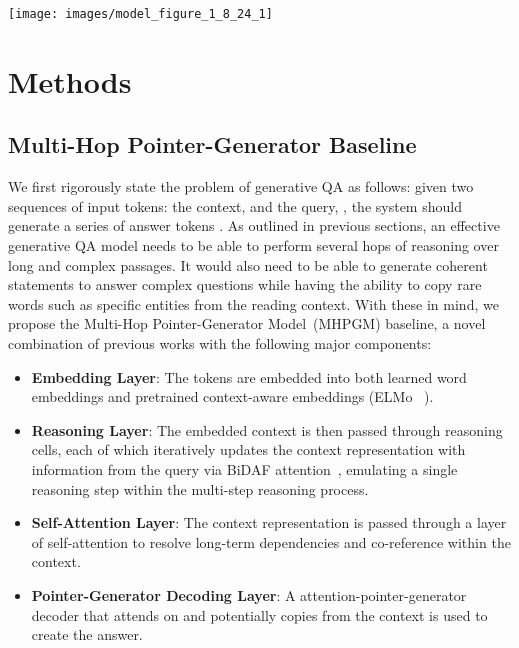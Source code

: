 \documentclass[11pt,a4paper]{article}
\newcommand{\baseline}{Multi-Hop Pointer-Generator Model}
\newcommand{\baselineAbbv}{MHPGM}
\newcommand{\fullModel}{NOIC}
\begin{document}
\begin{figure*}[t] 
	\centering
    \texttt{[image: images/model\_figure\_1\_8\_24\_1]}
    \vspace{-10pt}
    \caption{Architecture for our \baseline, and the \fullModel\ commonsense reasoning cell.
        \label{fig:model_figure}
        \vspace{-5pt}
    }
\end{figure*}


 \section{Methods}
\label{sec:methods}

\subsection{Multi-Hop Pointer-Generator Baseline}
\label{sec:models}

We first rigorously state the problem of generative QA as follows: given two sequences of input tokens: the context,  and the query, , the system should generate a series of answer tokens .
As outlined in previous sections, an effective generative QA model needs to be able to perform several hops of reasoning over long and complex passages.
It would also need to be able to generate coherent statements to answer complex questions while having the ability to copy rare words such as specific entities from the reading context.
With these in mind, we propose the \baseline\ (\baselineAbbv) baseline, a novel combination of previous works with the following major components:
\begin{itemize}[leftmargin=*]
    \setlength\itemsep{-0.45em}
    \item \textbf{Embedding Layer}: The tokens are embedded into both learned word embeddings and pretrained context-aware embeddings (ELMo ~\cite{peters2018deep}).
    \item \textbf{Reasoning Layer}: The embedded context is then passed through  reasoning cells, each of which iteratively updates the context representation with information from the query via BiDAF attention~\cite{seo2016bidirectional}, emulating a single reasoning step within the multi-step reasoning process.
    \item \textbf{Self-Attention Layer}: The context representation is passed through a layer of self-attention \cite{cheng2016long} to resolve long-term dependencies and co-reference within the context.
    \item \textbf{Pointer-Generator Decoding Layer}: A attention-pointer-generator decoder \cite{see2017get} that attends on and potentially copies from the context is used to create the answer.
\end{itemize}
\end{document}
